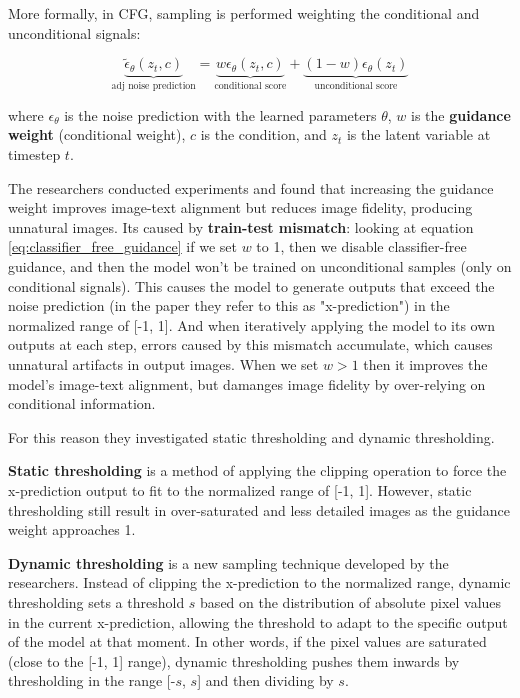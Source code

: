 More formally, in CFG, sampling is performed weighting the conditional and unconditional signals:

\begin{equation}
    \underbrace{\tilde{\epsilon}_\theta (z_t, c)}_{\text{adj noise prediction}} = \underbrace{w \epsilon_\theta (z_t, c)}_{\text{conditional score}} + \underbrace{(1 - w) \epsilon_\theta (z_t)}_{\text{unconditional score}}
    \label{eq:classifier_free_guidance}
\end{equation}

where $\epsilon_\theta$ is the noise prediction with the learned parameters $\theta$, $w$ is the \textbf{guidance weight} (conditional weight), $c$ is the condition, and $z_t$ is the latent variable at timestep $t$.

The researchers conducted experiments and found that increasing the guidance weight improves image-text alignment but reduces image fidelity, producing unnatural images. Its caused by \textbf{train-test mismatch}: looking at equation \ref{eq:classifier_free_guidance} if we set $w$ to 1, then we disable classifier-free guidance, and then the model won't be trained on unconditional samples (only on conditional signals). This causes the model to generate outputs that exceed the noise prediction (in the paper they refer to this as "x-prediction") in the normalized range of [-1, 1]. And when iteratively applying the model to its own outputs at each step, errors caused by this mismatch accumulate, which causes unnatural artifacts in output images. When we set $w>1$ then it improves the model's image-text alignment, but damanges image fidelity by over-relying on conditional information.

For this reason they investigated static thresholding and dynamic thresholding.

\textbf{Static thresholding} is a method of applying the clipping operation to force the x-prediction output to fit to the normalized range of [-1, 1]. However, static thresholding still result in over-saturated and less detailed images as the guidance weight approaches 1.

\textbf{Dynamic thresholding} is a new sampling technique developed by the researchers. Instead of clipping the x-prediction to the normalized range, dynamic thresholding sets a threshold $s$ based on the distribution of absolute pixel values in the current x-prediction, allowing the threshold to adapt to the specific output of the model at that moment. In other words, if the pixel values are saturated (close to the [-1, 1] range), dynamic thresholding pushes them inwards by thresholding in the range [-$s$, $s$] and then dividing by $s$.

